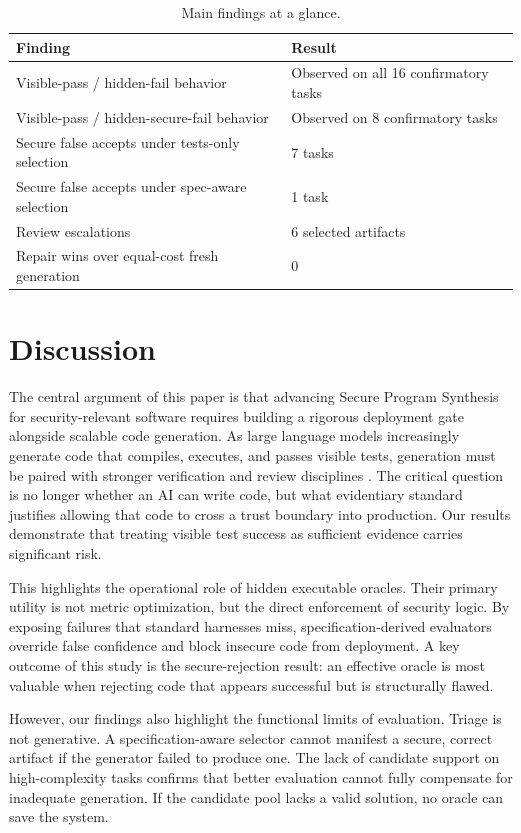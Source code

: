 \documentclass[11pt]{article}
\begin{document}
\begin{table}[h]
\centering
\caption{Main findings at a glance.}
\label{tab:main-findings}
\begin{tabular}{p{2.1in}p{2.9in}}
\hline
Finding & Result \\
\hline
Visible-pass / hidden-fail behavior & Observed on all 16 confirmatory tasks \\
Visible-pass / hidden-secure-fail behavior & Observed on 8 confirmatory tasks \\
Secure false accepts under tests-only selection & 7 tasks \\
Secure false accepts under spec-aware selection & 1 task \\
Review escalations & 6 selected artifacts \\
Repair wins over equal-cost fresh generation & 0 \\
\hline
\end{tabular}
\end{table}

\section{Discussion}

The central argument of this paper is that advancing Secure Program Synthesis for security-relevant software requires building a rigorous deployment gate alongside scalable code generation. As large language models increasingly generate code that compiles, executes, and passes visible tests, generation must be paired with stronger verification and review disciplines \cite{Bursuc2025Vericoding}. The critical question is no longer whether an AI can write code, but what evidentiary standard justifies allowing that code to cross a trust boundary into production. Our results demonstrate that treating visible test success as sufficient evidence carries significant risk.

This highlights the operational role of hidden executable oracles. Their primary utility is not metric optimization, but the direct enforcement of security logic. By exposing failures that standard harnesses miss, specification-derived evaluators override false confidence and block insecure code from deployment. A key outcome of this study is the secure-rejection result: an effective oracle is most valuable when rejecting code that appears successful but is structurally flawed.

However, our findings also highlight the functional limits of evaluation. Triage is not generative. A specification-aware selector cannot manifest a secure, correct artifact if the generator failed to produce one. The lack of candidate support on high-complexity tasks confirms that better evaluation cannot fully compensate for inadequate generation. If the candidate pool lacks a valid solution, no oracle can save the system.
\end{document}
